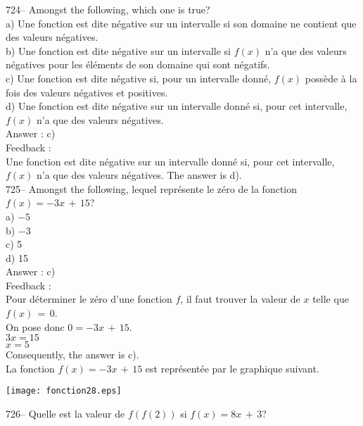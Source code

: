 \documentclass[letterpaper, 12pt]{article}
\begin{document}
724-- Amongst the following, which one is true?\\
a) Une fonction est dite n\'egative sur un intervalle si son domaine ne
contient que des valeurs n\'egatives.\\
b) Une fonction est dite n\'egative sur un intervalle si $f(x)$ n'a que des
valeurs n\'egatives pour les \'el\'ements de son domaine qui sont
n\'egatifs.\\
c) Une fonction est dite n\'egative si, pour un intervalle donn\'e, $f(x)$
poss\`ede \`a la fois des valeurs n\'egatives et positives.  \\
d) Une fonction est dite n\'egative sur un intervalle donn\'e si, pour cet
intervalle, $f(x)$ n'a que des valeurs n\'egatives.  \\

Answer : c)\\

Feedback : \\
Une fonction est dite n\'egative sur un intervalle donn\'e si, pour cet
intervalle, $f(x)$ n'a que des valeurs n\'egatives.  The answer is d).\\

725-- Amongst the following, lequel repr\'esente le z\'ero de la
fonction $f(x)=-3x\,+\,15$?\\
a) $-5$\\
b) $-3$\\
c) 5\\
d) 15\\

Answer : c)\\

Feedback : \\
Pour d\'eterminer le z\'ero d'une fonction $f$, il faut trouver la valeur de
$x$ telle que $f(x)\,=\,0$.\\
On pose donc $0=-3x\,+\,15$.\\
$3x=15$\\
$x=5$\\
Consequently, the answer is c).\\
La fonction $f(x)=-3x\,+\,15$ est repr\'esent\'ee par le graphique
suivant.\\
    \begin{center}
    \texttt{[image: fonction28.eps]}
    \end{center}

726-- Quelle est la valeur de $f(f(2))$ si $f(x)=8x\,+\,3$?\\
\end{document}
